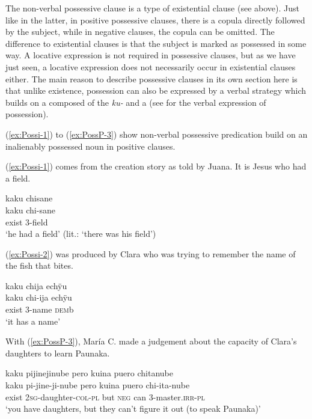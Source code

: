 The non-verbal possessive clause is a type of existential clause (see  above). Just like in the latter, in positive possessive clauses, there is a copula directly followed by the subject, while in negative clauses, the copula can be omitted. The difference to existential clauses is that the subject is marked as possessed in some way. A locative expression is not required in possessive clauses, but as we have just seen, a locative expression does not necessarily occur in existential clauses either. The main reason to describe possessive clauses in its own section here is that unlike existence, possession can also be expressed by a verbal strategy which builds on a  composed of the  \textit{ku-} and a  (see  for the verbal expression of possession).

(\ref{ex:Possi-1}) to (\ref{ex:PossP-3}) show non-verbal possessive predication build on an inalienably possessed noun in positive clauses.

(\ref{ex:Possi-1}) comes from the creation story as told by Juana. It is Jesus who had a field.

\ea\label{ex:Possi-1}
\begingl
\glpreamble kaku chisane\\
\gla kaku chi-sane\\
\glb exist 3-field\\
\glft ‘he had a field’ (lit.: ‘there was his field’)
\endgl
\trailingcitation{[jxx-n101013s-1.555]}
\xe

(\ref{ex:Possi-2}) was produced by Clara who was trying to remember the name of the fish that bites.

\ea\label{ex:Possi-2}
\begingl
\glpreamble kaku chija echÿu\\
\gla kaku chi-ija echÿu\\
\glb exist 3-name \textsc{dem}b\\
\glft ‘it has a name’
\endgl
\trailingcitation{[cux-c120414ls-1.217]}
\xe

With (\ref{ex:PossP-3}), María C. made a judgement about the capacity of Clara’s daughters to learn Paunaka.

\ea\label{ex:PossP-3}
\begingl 
\glpreamble kaku pijinejinube pero kuina puero chitanube\\
\gla kaku pi-jine-ji-nube pero kuina puero chi-ita-nube\\ 
\glb exist 2\textsc{sg}-daughter-\textsc{col}-\textsc{pl} but \textsc{neg} can 3-master.\textsc{irr}-\textsc{pl}\\ 
\glft ‘you have daughters, but they can't figure it out (to speak Paunaka)’\\ 
\endgl
\trailingcitation{[cux-c120414ls-2.265]}
\xe


